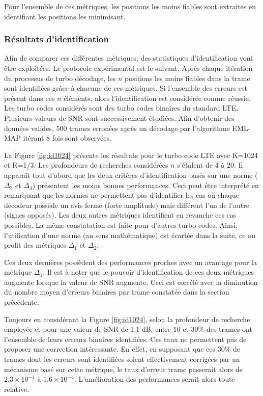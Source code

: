 Pour l'ensemble de ces métriques, les positions les moins fiables sont extraites en identifiant les positions les 
minimisant.

\subsubsection{Résultats d'identification}
Afin de comparer ces différentes métriques, des statistiques d'identification vont être exploitées. Le protocole 
expérimental est le suivant. Après chaque itération du processus de turbo décodage, les $n$ positions les moins fiables
dans la trame sont identifiées grâce à chacune de ces métriques. Si l'ensemble des erreurs est présent dans ces $n$ éléments,
alors l'identification est considérée comme réussie. Les turbo codes considérés sont des turbo codes binaires du standard LTE.
Plusieurs valeurs de SNR sont successivement étudiées. Afin 
d'obtenir des données valides, 500 trames erronées après un décodage par l'algorithme EML-MAP itérant 8 fois sont
observées.

La Figure \ref{fig:id1024} présente les résultats pour le turbo code LTE avec K=1024 et R=1/3. Les profondeurs de recherches 
considérées $n$ s'étalent de 4 à 20. Il apparaît tout d'abord que 
les deux critères d'identification basés sur une norme ($\Delta_3$ et $\Delta_4$) présentent les moins bonnes performances.
 Ceci peut être interprété en remarquant que les normes ne permettent pas d'identifier les
cas où chaque décodeur possède un avis ferme (forte amplitude) mais différent l'un de l'autre (signes opposés). Les deux 
autres métriques identifient en revanche ces cas possibles. La même constatation est faite pour d'autres turbo codes. 
Ainsi, l'utilisation d'une norme (au sens mathématique) est écartée dans la suite, ce au profit des métriques $\Delta_1$ 
et $\Delta_2$.

Ces deux dernières possèdent des performances proches avec un avantage pour la métrique $\Delta_1$. Il est à noter que le pouvoir 
d'identification de ces deux métriques augmente lorsque la valeur de SNR augmente. Ceci est corrélé avec la diminution du 
nombre moyen d'erreurs binaires par trame constatée dans la section précédente.

Toujours en considérant la Figure \ref{fig:id1024}, selon la profondeur de recherche employée et pour une valeur de SNR 
de 1.1 dB, entre 10 et 30\% des trames ont l'ensemble de leurs erreurs binaires identifiées. Ces taux ne 
permettent pas de proposer une correction intéressante. En effet, en supposant que ces 30\% de trames dont les erreurs sont 
identifiées soient effectivement corrigées par un mécanisme basé sur cette métrique, le taux d'erreur trame passerait alors 
de $2.3\times 10^{-4}$ à $1.6\times 10^{-4}$. L'amélioration des performances serait alors toute relative.

